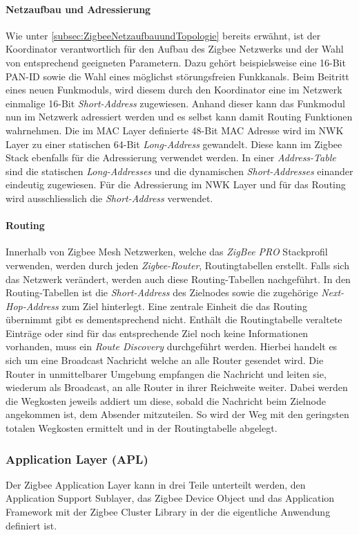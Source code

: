 \paragraph{Netzaufbau und Adressierung}
Wie unter \ref{subsec:ZigbeeNetzaufbauundTopologie} bereits erwähnt, ist der Koordinator verantwortlich für den Aufbau des Zigbee Netzwerks und der Wahl von entsprechend geeigneten Parametern.
Dazu gehört beispielsweise eine 16-Bit PAN-ID sowie die Wahl eines möglichst störungsfreien Funkkanals.
Beim Beitritt eines neuen Funkmoduls, wird diesem durch den Koordinator eine im Netzwerk einmalige 16-Bit \textit{Short-Address} zugewiesen.
Anhand dieser kann das Funkmodul nun im Netzwerk adressiert werden und es selbst kann damit Routing Funktionen wahrnehmen.
Die im MAC Layer definierte 48-Bit MAC Adresse wird im NWK Layer zu einer statischen 64-Bit \textit{Long-Address} gewandelt.
Diese kann im Zigbee Stack ebenfalls für die Adressierung verwendet werden.
In einer \textit{Address-Table} sind die statischen \textit{Long-Addresses} und die dynamischen \textit{Short-Addresses} einander eindeutig zugewiesen.
Für die Adressierung im NWK Layer und für das Routing wird ausschliesslich die \textit{Short-Address} verwendet.

\paragraph{Routing}
Innerhalb von Zigbee Mesh Netzwerken, welche das \textit{ZigBee PRO} Stackprofil verwenden, werden durch jeden \textit{Zigbee-Router}, Routingtabellen erstellt.
Falls sich das Netzwerk verändert, werden auch diese Routing-Tabellen nachgeführt.
In den Routing-Tabellen ist die \textit{Short-Address} des Zielnodes sowie die zugehörige \textit{Next-Hop-Address} zum Ziel hinterlegt.
Eine zentrale Einheit die das Routing übernimmt gibt es dementsprechend nicht.
Enthält die Routingtabelle veraltete Einträge oder sind für das entsprechende Ziel noch keine Informationen vorhanden, muss ein \textit{Route Discovery} durchgeführt werden.
Hierbei handelt es sich um eine Broadcast Nachricht welche an alle Router gesendet wird.
Die Router in unmittelbarer Umgebung empfangen die Nachricht und leiten sie, wiederum als Broadcast, an alle Router in ihrer Reichweite weiter.
Dabei werden die Wegkosten jeweils addiert um diese, sobald die Nachricht beim Zielnode angekommen ist, dem Absender mitzuteilen.
So wird der Weg mit den geringsten totalen Wegkosten ermittelt und in der Routingtabelle abgelegt.


\subsubsection{Application Layer (APL)}\label{subsubsec:ApplicationLayer}
Der Zigbee Application Layer kann in drei Teile unterteilt werden, den Application Support Sublayer, das Zigbee Device Object und das Application Framework mit der Zigbee Cluster Library in der die eigentliche Anwendung definiert ist.

